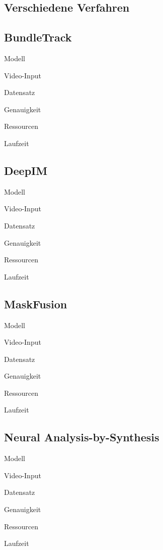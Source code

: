 \documentclass[a4paper, 11pt]{article}
\begin{document}
\begin{multicols*}{2}
    \section{Verschiedene Verfahren}
    \subsection{BundleTrack\cite{BundleTrack}}
    \begin{description*}
        \item[Modell]
        \item[Video-Input]
        \item[Datensatz]
        \item[Genauigkeit]
        \item[Ressourcen]
        \item[Laufzeit]
    \end{description*}

    \subsection{DeepIM\cite{Deepim}}
    \begin{description*}
        \item[Modell]
        \item[Video-Input]
        \item[Datensatz]
        \item[Genauigkeit]
        \item[Ressourcen]
        \item[Laufzeit]
    \end{description*}

    \subsection{MaskFusion\cite{MaskFusion}}
    \begin{description*}
        \item[Modell]
        \item[Video-Input]
        \item[Datensatz]
        \item[Genauigkeit]
        \item[Ressourcen]
        \item[Laufzeit]
    \end{description*}

    \subsection{Neural Analysis-by-Synthesis\cite{CategoryLevelObject}}
    \begin{description*}
        \item[Modell]
        \item[Video-Input]
        \item[Datensatz]
        \item[Genauigkeit]
        \item[Ressourcen]
        \item[Laufzeit]
    \end{description*}


\end{multicols*}
\end{document}
